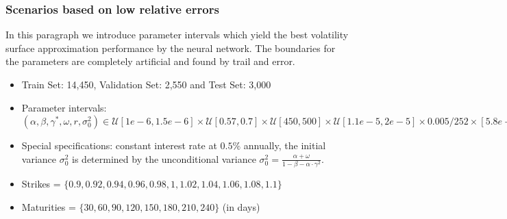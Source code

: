 \documentclass{article}
\begin{document}
\subsubsection{Scenarios based on low relative errors}\label{sec:setupomega20}
In this paragraph we introduce parameter intervals which yield the best volatility surface approximation performance by the neural network. The boundaries for the parameters are completely artificial and found by trail and error.
\begin{itemize}
    \item Train Set: 14,450, Validation Set: 2,550 and Test Set: 3,000
    \item Parameter intervals: $(\alpha, \beta, \gamma^*, \omega, r ,\sigma_0^2) \in \mathcal{U}[1e-6, 1.5e-6] \times \mathcal{U}[0.57, 0.7] \times \mathcal{U}[450, 500] \times \mathcal{U}[1.1e-5, 2e-5] \times 0.005/252 \times [5.8e-5, 2e-4]$
    \item Special specifications: constant interest rate at $0.5\%$ annually, the initial variance $\sigma_0^2$ is determined by the unconditional variance  $\sigma_0^2 = \frac{\alpha+\omega}{1-\beta-\alpha\cdot\gamma^2}$.
    \item Strikes = $\{0.9, 0.92, 0.94, 0.96, 0.98, 1, 1.02, 1.04, 1.06, 1.08, 1.1\}$
    \item Maturities = $\{30, 60, 90, 120, 150, 180, 210, 240\}$ (in days)
\end{itemize}
\end{document}
